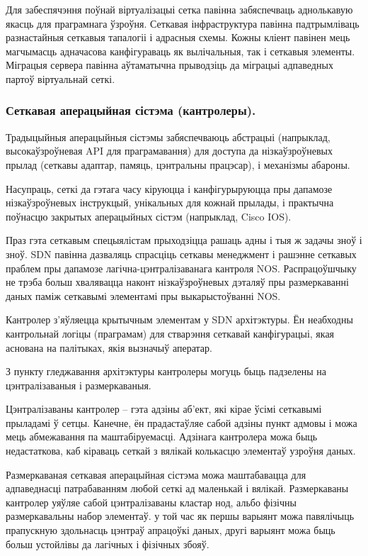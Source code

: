 Для забеспячэння поўнай віртуалізацыі сетка павінна забяспечваць аднолькавую якасць
для праграмнага ўзроўня. Сеткавая інфраструктура павінна падтрымліваць разнастайныя
сеткавыя тапалогіі і адрасныя схемы. Кожны кліент павінен мець магчымасць
адначасова канфігураваць як вылічальныя, так і сеткавыя элементы. Міграцыя сервера
павінна аўтаматычна прыводзіць да міграцыі адпаведных партоў віртуальнай сеткі.

\subsubsection{Сеткавая аперацыйная сістэма (кантролеры).}

Традыцыйныя аперацыйныя сістэмы забяспечваюць абстрацыі (напрыклад, высокаўзроўневая API для праграмавання) для доступа да нізкаўзроўневых прылад (сеткавы адаптар, памяць, цэнтральны працэсар), і механізмы абароны.

Насупраць, сеткі да гэтага часу кіруюцца і канфігурыруюцца пры дапамозе нізкаўзроўневых
інструкцый, унікальных для кожнай прылады, і практычна поўнасцю закрытых аперацыйных
сістэм (напрыклад, Cisco IOS).

Праз гэта сеткавым спецыялістам прыходзіцца рашаць адны і тыя ж задачы зноў і зноў.
SDN павінна дазваляць спрасціць сеткавы менеджмент і рашэнне сеткавых праблем
пры дапамозе лагічна-цэнтралізаванага кантроля NOS. Распрацоўшчыку не трэба
больш хвалявацца наконт нізкаўзроўневых дэталяў пры размеркаванні
даных паміж сеткавымі элементамі пры выкарыстоўванні NOS.

Кантролер з'яўляецца крытычным элементам у SDN архітэктуры. Ён неабходны кантрольнай
логіцы (праграмам) для стварэння сеткавай канфігурацыі, якая аснована на палітыках,
якія вызначыў аператар.

З пункту гледжавання архітэктуры кантролеры могуць быць падзелены на цэнтралізаваныя
і размеркаваныя.

Цэнтралізаваны кантролер -- гэта адзіны аб'ект, які кірае ўсімі сеткавымі прыладамі
ў сетцы. Канечне, ён прадастаўляе сабой адзіны пункт адмовы і можа мець абмежавання
па маштабіруемасці. Адзінага кантролера можа быць недастаткова, каб кіраваць
сеткай з вялікай колькасцю элементаў узроўня даных.

Размеркаваная сеткавая аперацыйная сістэма можа маштабавацца для адпаведнасці
патрабаванням любой сеткі ад маленькай і вялікай. Размеркаваны кантролер
уяўляе сабой цэнтралізаваны кластар нод, альбо фізічны размеркавальны набор элементаў.
у той час як першы варыянт можа павялічыць прапускную здольнасць цэнтраў апрацоўкі даных, другі варыянт можа быць больш устойлівы да лагічных і фізічных збояў.

